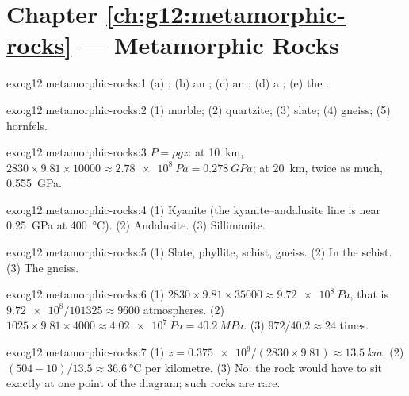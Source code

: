 \section*{Chapter \ref{ch:g12:metamorphic-rocks} --- Metamorphic Rocks}

\begin{solution}{exo:g12:metamorphic-rocks:1}
(a) ; (b) an ; (c) an ; (d) a ;
(e) the .
\end{solution}

\begin{solution}{exo:g12:metamorphic-rocks:2}
(1) marble; (2) quartzite; (3) slate; (4) gneiss; (5) hornfels.
\end{solution}

\begin{solution}{exo:g12:metamorphic-rocks:3}
$P = \rho g z$: at \qty{10}{km}, $2830 \times 9.81 \times \num{10000} \approx
\qty{2.78e8}{Pa} = \qty{0.278}{GPa}$; at \qty{20}{km}, twice as much,
\qty{0.555}{GPa}.
\end{solution}

\begin{solution}{exo:g12:metamorphic-rocks:4}
(1) Kyanite (the kyanite--andalusite line is near \qty{0.25}{GPa} at
\qty{400}{\celsius}). (2) Andalusite. (3) Sillimanite.
\end{solution}

\begin{solution}{exo:g12:metamorphic-rocks:5}
(1) Slate, phyllite, schist, gneiss. (2) In the schist. (3) The gneiss.
\end{solution}

\begin{solution}{exo:g12:metamorphic-rocks:6}
(1) $2830 \times 9.81 \times \num{35000} \approx \qty{9.72e8}{Pa}$, that is
$\num{9.72e8}/101325 \approx \num{9600}$ atmospheres. (2) $1025 \times 9.81
\times 4000 \approx \qty{4.02e7}{Pa} = \qty{40.2}{MPa}$. (3) $972/40.2
\approx 24$ times.
\end{solution}

\begin{solution}{exo:g12:metamorphic-rocks:7}
(1) $z = \num{0.375e9}/(2830 \times 9.81) \approx \qty{13.5}{km}$.
(2) $(504 - 10)/13.5 \approx \qty{36.6}{\celsius}$ per kilometre. (3) No:
the rock would have to sit exactly at one point of the diagram; such rocks
are rare.
\end{solution}

